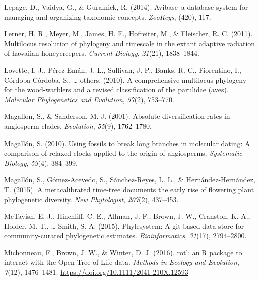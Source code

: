 \documentclass[
  man]{apa6}
\newlength{\cslhangindent}
\newlength{\cslentryspacingunit} %
\newenvironment{CSLReferences}[2] %
 {%
  \setlength{\parindent}{0pt}
  \ifodd #1
  \let\oldpar\par
  \def\par{\hangindent=\cslhangindent\oldpar}
  \fi
  \setlength{\parskip}{#2\cslentryspacingunit}
 }%
 {}
\begin{document}
\begin{CSLReferences}{1}{0}
\leavevmode{}%
Lepage, D., Vaidya, G., \& Guralnick, R. (2014). Avibase--a database system for managing and organizing taxonomic concepts. \emph{ZooKeys}, (420), 117.

\leavevmode{}%
Lerner, H. R., Meyer, M., James, H. F., Hofreiter, M., \& Fleischer, R. C. (2011). Multilocus resolution of phylogeny and timescale in the extant adaptive radiation of hawaiian honeycreepers. \emph{Current Biology}, \emph{21}(21), 1838--1844.

\leavevmode{}%
Lovette, I. J., Pérez-Emán, J. L., Sullivan, J. P., Banks, R. C., Fiorentino, I., Córdoba-Córdoba, S., \ldots{} others. (2010). A comprehensive multilocus phylogeny for the wood-warblers and a revised classification of the parulidae (aves). \emph{Molecular Phylogenetics and Evolution}, \emph{57}(2), 753--770.

\leavevmode{}%
Magallon, S., \& Sanderson, M. J. (2001). Absolute diversification rates in angiosperm clades. \emph{Evolution}, \emph{55}(9), 1762--1780.

\leavevmode{}%
Magallón, S. (2010). Using fossils to break long branches in molecular dating: A comparison of relaxed clocks applied to the origin of angiosperms. \emph{Systematic Biology}, \emph{59}(4), 384--399.

\leavevmode{}%
Magallón, S., Gómez-Acevedo, S., Sánchez-Reyes, L. L., \& Hernández-Hernández, T. (2015). A metacalibrated time-tree documents the early rise of flowering plant phylogenetic diversity. \emph{New Phytologist}, \emph{207}(2), 437--453.

\leavevmode{}%
McTavish, E. J., Hinchliff, C. E., Allman, J. F., Brown, J. W., Cranston, K. A., Holder, M. T., \ldots{} Smith, S. A. (2015). Phylesystem: A git-based data store for community-curated phylogenetic estimates. \emph{Bioinformatics}, \emph{31}(17), 2794--2800.

\leavevmode{}%
Michonneau, F., Brown, J. W., \& Winter, D. J. (2016). {rotl: an R package to interact with the Open Tree of Life data}. \emph{{Methods in Ecology and Evolution}}, \emph{7}(12), 1476--1481. \url{https://doi.org/10.1111/2041-210X.12593}


\end{CSLReferences}
\end{document}
